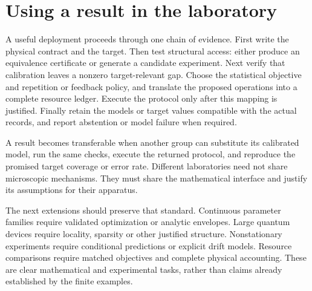 \section{Using a result in the laboratory}
A useful deployment proceeds through one chain of evidence. First write the physical contract and the target. Then test structural access: either produce an equivalence certificate or generate a candidate experiment. Next verify that calibration leaves a nonzero target-relevant gap. Choose the statistical objective and repetition or feedback policy, and translate the proposed operations into a complete resource ledger. Execute the protocol only after this mapping is justified. Finally retain the models or target values compatible with the actual records, and report abstention or model failure when required.

A result becomes transferable when another group can substitute its calibrated model, run the same checks, execute the returned protocol, and reproduce the promised target coverage or error rate. Different laboratories need not share microscopic mechanisms. They must share the mathematical interface and justify its assumptions for their apparatus.

The next extensions should preserve that standard. Continuous parameter families require validated optimization or analytic envelopes. Large quantum devices require locality, sparsity or other justified structure. Nonstationary experiments require conditional predictions or explicit drift models. Resource comparisons require matched objectives and complete physical accounting. These are clear mathematical and experimental tasks, rather than claims already established by the finite examples.
